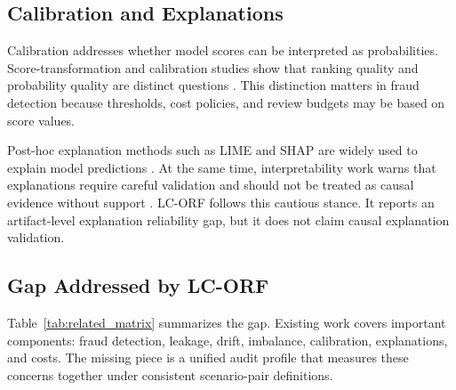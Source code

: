 \documentclass{ieeeaccess}
\begin{document}
\subsection{Calibration and Explanations}
Calibration addresses whether model scores can be interpreted as probabilities. Score-transformation and calibration studies show that ranking quality and probability quality are distinct questions \cite{zadrozny2002calibrating,niculescu2005predicting,guo2017calibration}. This distinction matters in fraud detection because thresholds, cost policies, and review budgets may be based on score values.

Post-hoc explanation methods such as LIME and SHAP are widely used to explain model predictions \cite{ribeiro2016lime,lundberg2017shap}. At the same time, interpretability work warns that explanations require careful validation and should not be treated as causal evidence without support \cite{lipton2016mythos,adebayo2018sanity,alvarez2018robustness}. LC-ORF follows this cautious stance. It reports an artifact-level explanation reliability gap, but it does not claim causal explanation validation.

\subsection{Gap Addressed by LC-ORF}
Table~\ref{tab:related_matrix} summarizes the gap. Existing work covers important components: fraud detection, leakage, drift, imbalance, calibration, explanations, and costs. The missing piece is a unified audit profile that measures these concerns together under consistent scenario-pair definitions.
\end{document}
